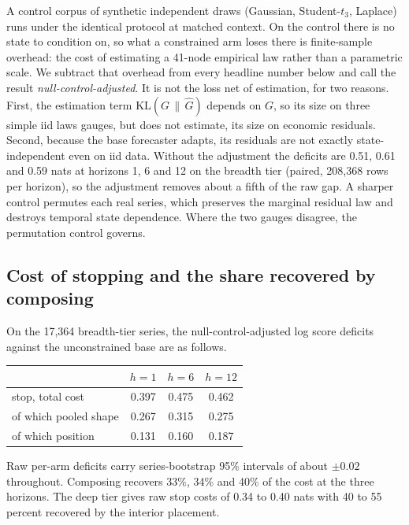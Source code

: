 \documentclass[11pt]{article}
\theoremstyle{remark}
\newcommand{\KLop}{\mathrm{KL}}
\begin{document}
A control corpus of synthetic independent draws (Gaussian, Student-$t_3$,
Laplace) runs under the identical protocol at matched context. On the control
there is no state to condition on, so what a constrained arm loses there is
finite-sample overhead: the cost of estimating a 41-node empirical law rather
than a parametric scale. We subtract that overhead from every headline
number below and call the result \emph{null-control-adjusted}. It is not the loss
net of estimation, for two reasons. First, the estimation term
$\KLop(G\,\|\,\widehat G)$ depends on $G$, so its size on three simple iid laws
gauges, but does not estimate, its size on economic residuals. Second, because the
base forecaster adapts, its residuals are not exactly state-independent even on iid
data. Without the adjustment the deficits are 0.51, 0.61 and 0.59 nats at horizons
1, 6 and 12 on the breadth tier (paired, 208{,}368 rows per horizon), so the
adjustment removes about a fifth of the raw gap. A
sharper control permutes each real series, which preserves the marginal residual
law and destroys temporal state dependence. Where the two gauges disagree, the
permutation control governs.

\subsection{Cost of stopping and the share recovered by composing}\label{sec:decomp}

On the 17{,}364 breadth-tier series, the null-control-adjusted log score deficits
against the unconstrained base are as follows.

\begin{center}
\begin{tabular}{lccc}
\toprule
 & $h{=}1$ & $h{=}6$ & $h{=}12$ \\
\midrule
stop, total cost            & 0.397 & 0.475 & 0.462 \\
\quad of which pooled shape & 0.267 & 0.315 & 0.275 \\
\quad of which position     & 0.131 & 0.160 & 0.187 \\
\bottomrule
\end{tabular}
\end{center}

Raw per-arm deficits carry series-bootstrap 95\% intervals of about $\pm 0.02$
throughout. Composing recovers 33\%, 34\% and 40\% of the cost at the three
horizons. The deep tier gives raw stop
costs of 0.34 to 0.40 nats with 40 to 55 percent recovered by the interior
placement.
\end{document}
